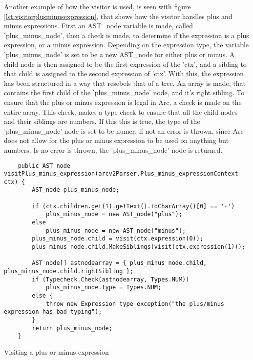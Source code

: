 Another example of how the visitor is used, is seen with figure \ref{lst:visitorplusminusexpression}, that shows how the visitor handles plus and minus expressions. First an AST\_node variable is made, called 'plus\_minus\_node', then a check is made, to determine if the expression is a plus expression, or a minus expression. Depending on the expression type, the variable 'plus\_minus\_node' is set to be a new AST\_node for either plus or minus. A child node is then assigned to be the first expression of the 'ctx', and a sibling to that child is assigned to the second expression of 'ctx'. With this, the expression has been structured in a way that resebels that of a tree. An array is made, that contains the first child of the 'plus\_minus\_node' node, and it's right sibling. To ensure that the plus or minus expression is legal in Arc, a check is made on the entire array. This check, makes a type check to ensure that all the child nodes and their siblings are numbers. If this this is true, the type of the 'plus\_minus\_node' node is set to be numer, if not an error is thrown, since Arc does not allow for the plus or minus expression to be used on anything but numbers. Is no error is thrown, the 'plus\_minus\_node' node is returned.

\begin{listing}[htb!]
    \begin{verbatim}
    public AST_node visitPlus_minus_expression(arcv2Parser.Plus_minus_expressionContext ctx) {
        AST_node plus_minus_node;

        if (ctx.children.get(1).getText().toCharArray()[0] == '+')
            plus_minus_node = new AST_node("plus");
        else
            plus_minus_node = new AST_node("minus");
        plus_minus_node.child = visit(ctx.expression(0));
        plus_minus_node.child.MakeSiblings(visit(ctx.expression(1)));

        AST_node[] astnodearray = { plus_minus_node.child, plus_minus_node.child.rightSibling };
        if (Typecheck.Check(astnodearray, Types.NUM))
            plus_minus_node.type = Types.NUM;
        else {
            throw new Expression_type_exception("the plus/minus expression has bad typing");
        }
        return plus_minus_node;
    }
    \end{verbatim}
    \caption{Visiting a plus or minus expression}
    \label{lst:visitorplusminusexpression}
\end{listing}


        





